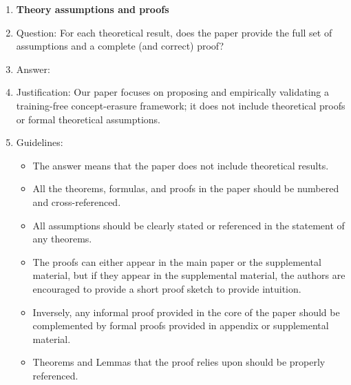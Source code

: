 \begin{enumerate}
\item {\bf Theory assumptions and proofs}
    \item[] Question: For each theoretical result, does the paper provide the full set of assumptions and a complete (and correct) proof?
    \item[] Answer: \answerNA{}
    \item[] Justification: Our paper focuses on proposing and empirically validating a training-free concept-erasure framework; it does not include theoretical proofs or formal theoretical assumptions.
    \item[] Guidelines:
    \begin{itemize}
        \item The answer \answerNA{} means that the paper does not include theoretical results.
        \item All the theorems, formulas, and proofs in the paper should be numbered and cross-referenced.
        \item All assumptions should be clearly stated or referenced in the statement of any theorems.
        \item The proofs can either appear in the main paper or the supplemental material, but if they appear in the supplemental material, the authors are encouraged to provide a short proof sketch to provide intuition.
        \item Inversely, any informal proof provided in the core of the paper should be complemented by formal proofs provided in appendix or supplemental material.
        \item Theorems and Lemmas that the proof relies upon should be properly referenced.
    \end{itemize}


\end{enumerate}
